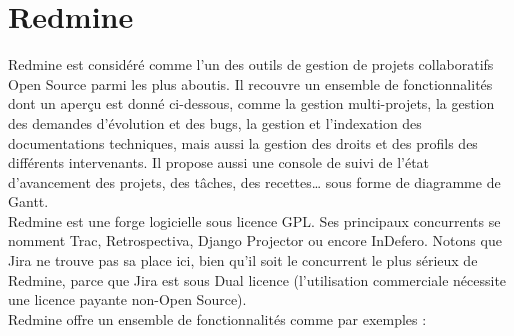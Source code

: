 \pagebreak


\section{Redmine}\label{Annexe C}

Redmine est considéré comme l’un des outils de gestion de projets collaboratifs Open Source parmi les plus aboutis. Il recouvre un ensemble de fonctionnalités dont un aperçu est donné ci-dessous, comme la gestion multi-projets, la gestion des demandes d’évolution et des bugs, la gestion et l’indexation des documentations techniques, mais aussi la gestion des droits et des profils des différents intervenants. Il propose aussi une console de suivi de l’état d’avancement des projets, des tâches, des recettes… sous forme de diagramme de Gantt.\\

Redmine est une forge logicielle sous licence GPL. Ses principaux concurrents se nomment Trac, Retrospectiva, Django Projector ou encore InDefero. Notons que Jira ne trouve pas sa place ici, bien qu’il soit le concurrent le plus sérieux de Redmine, parce que Jira est sous Dual licence (l’utilisation commerciale nécessite une licence payante non-Open Source).\\

Redmine offre un ensemble de fonctionnalités comme par exemples :

